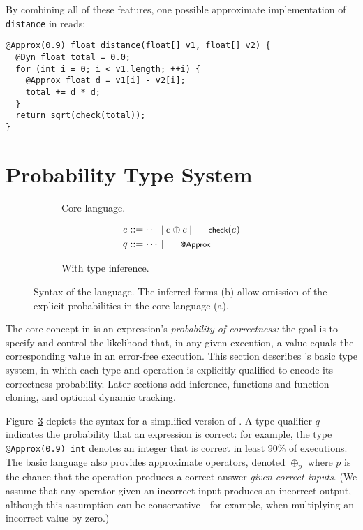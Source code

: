 \documentclass[10pt,nocopyrightspace,preprint]{sigplanconf}
\newcommand{\code}{\lstinline[emphstyle={},keywordstyle={}]}
\begin{document}
By combining all of these features, one possible approximate implementation of
\code{distance} in \lang reads:
%
\begin{lstlisting}
@Approx(0.9) float distance(float[] v1, float[] v2) {
  @Dyn float total = 0.0;
  for (int i = 0; i < v1.length; ++i) {
    @Approx float d = v1[i] - v2[i];
    total += d * d;
  }
  return sqrt(check(total));
}
\end{lstlisting}


\section{Probability Type System}
\label{sec:types}

\begin{figure}
    \begin{subfigure}{\linewidth}
        
        \vspace{-4ex}
        \caption{Core language.}
        \label{fig:syntax:core}
    \end{subfigure}
    \begin{subfigure}{\linewidth}
        \begin{align*}
            e &\defeq
                \cdots \alt
                e \oplus e \alt
                \mcode{check}(e) \\
            q &\defeq
                \cdots \alt
                \Approx
        \end{align*}
        \vspace{-4ex}
        \caption{With type inference.}
        \label{fig:syntax:inferred}
    \end{subfigure}
    \caption{Syntax of the \lang language. The inferred forms
    (b) allow omission of the explicit probabilities in
    the core language (a).}
    \label{fig:syntax}
\end{figure}

The core concept in \lang is an expression's \emph{probability of
correctness:}
the goal is to specify and control the likelihood that, in any given
execution, a value equals the corresponding value in an error-free execution.
This section describes \lang's basic type system, in which
each type and operation is explicitly qualified to encode its correctness
probability.
Later sections add inference, functions and function cloning, and optional dynamic tracking.

Figure~\ref{fig:syntax} depicts the syntax for a simplified version of \lang.
A type qualifier $q$ indicates
the probability that an
expression is correct:
for example, the type \code{@Approx(0.9) int} denotes an integer that is
correct in least 90\% of executions.
The basic language also provides approximate operators, denoted $\oplus_p$
where $p$ is the chance that the operation produces a correct answer
\emph{given correct inputs}.
(We assume that any operator given an incorrect input produces an incorrect
output, although this assumption can be conservative---for example, when
multiplying an incorrect value by zero.)
\end{document}
